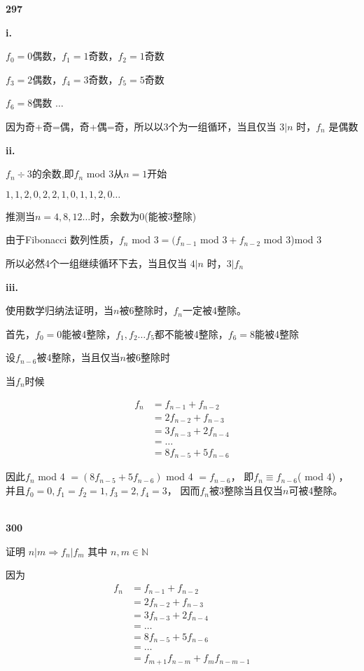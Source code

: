 \documentclass[UTF8]{ctexart}
\begin{document}
    \noindent\textbf{297}

    \textbf{i. }

    $f_0=0$偶数，$f_1=1$奇数，$f_2=1$奇数

    $f_3=2$偶数，$f_4=3$奇数，$f_5=5$奇数

    $f_6=8$偶数 $\dots$

    因为奇+奇=偶，奇+偶=奇，所以以3个为一组循环，当且仅当 $3|n$ 时，$f_n$ 是偶数

    \textbf{ii. }

    $f_n \div 3$的余数,即$f_n$ mod 3从$n=1$开始

    $1,1,2,0,2,2,1,0,1,1,2,0\dots$

    推测当$n=4,8,12\dots$时，余数为0(能被3整除)

    由于Fibonacci 数列性质，$f_n$ mod $3=(f_{n-1}$ mod $3+f_{n-2}$ mod $3$)mod 3

    所以必然4个一组继续循环下去，当且仅当 $4|n$ 时，$3|f_n$ 


    \textbf{iii. }

    使用数学归纳法证明，当$n$被6整除时，$f_n$一定被4整除。

    首先，$f_0=0$能被4整除，$f_1,f_2\dots f_5$都不能被4整除，$f_6=8$能被4整除

    设$f_{n-6}$被4整除，当且仅当$n$被6整除时

    当$f_n$时候
    
    \begin{equation*}
        \begin{aligned}
            f_{n}
            &=f_{n-1}+f_{n-2}\\
            &=2f_{n-2}+f_{n-3}\\
            &=3f_{n-3}+2f_{n-4}\\
            &=\dots \\
            &=8f_{n-5}+5f_{n-6}
        \end{aligned}
    \end{equation*}
    
    因此$f_n$ mod 4 $=(8f_{n-5}+5f_{n-6})$ mod 4 $=f_{n-6}$，
    即$f_n \equiv f_{n-6}$( mod 4) ，
    并且$f_0=0,f_1 =f_2 = 1, f_3 = 2, f_4 = 3$，
    因而$f_n$被3整除当且仅当$n$可被4整除。

    ~\\
    \noindent\textbf{300}

    证明 $n|m\Rightarrow f_n|f_m$ 其中 $n,m\in \mathbb{N} $


    因为
    \begin{equation*}
        \begin{aligned}
            f_{n}
            &=f_{n-1}+f_{n-2}\\
            &=2f_{n-2}+f_{n-3}\\
            &=3f_{n-3}+2f_{n-4}\\
            &=\dots \\
            &=8f_{n-5}+5f_{n-6}\\
            &=\dots\\
            &=f_{m+1}f_{n-m}+f_{m}f_{n-m-1}
        \end{aligned}
    \end{equation*}
\end{document}
